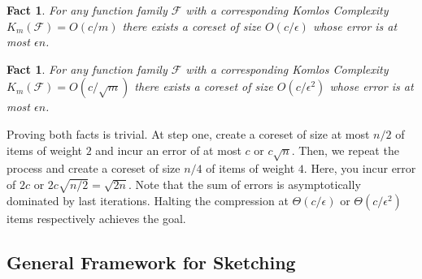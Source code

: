 \documentclass[anon,12pt]{colt2019} %
\newtheorem{fact}[theorem]{Fact}
\newcommand{\eps}{\epsilon}
\newcommand{\F}{\mathcal{F}}
\begin{document}
\begin{fact}
For any function family $\F$ with a corresponding Komlos Complexity $K_m(\F) = O(c/m)$ there exists a coreset of size 
$O(c/\eps)$ whose error is at most $\eps n$.
\end{fact}
\begin{fact}
For any function family $\F$ with a corresponding Komlos Complexity $K_m(\F) = O(c/\sqrt{m})$ there exists a coreset of size 
$O(c/\eps^2)$ whose error is at most $\eps n$.
\end{fact}

\noindent Proving both facts is trivial. 
At step one, create a coreset of size at most $n/2$ of items of weight $2$ and incur an error of at most $c$ or $c \sqrt{n}$.
Then, we repeat the process and create a coreset of size $n/4$ of items of weight $4$. Here, you incur error of $2c$ or $2c\sqrt{n/2}  = \sqrt{2n}$.
Note that the sum of errors is asymptotically dominated by last iterations. 
Halting the compression at $\Theta(c/\eps)$ or $\Theta(c/\eps^2)$ items respectively achieves the goal.


%
%

\subsection{General Framework for Sketching}
\end{document}
